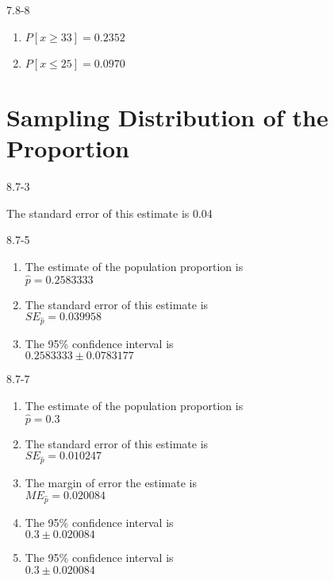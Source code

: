 \begin{exsol@solution}{7.8-8}



\begin{enumerate}
\item $P[ x \ge 33] = 0.2352$
\item $P[ x \le 25] = 0.0970$
\end{enumerate}

\end{exsol@solution}
\setcounter{chapter}{7}\chapter{Sampling Distribution of the Proportion}
\begin{exsol@solution}{8.7-3}

The standard error of this estimate is 0.04

\end{exsol@solution}
\begin{exsol@solution}{8.7-5}

\begin{enumerate}
\item	The estimate of the population proportion is \\ $ = 0.2583333$
\item	The standard error of this estimate is \\ $SE_{} = 0.039958$
\item	The 95\% confidence interval is \\ $0.2583333 $
\end{enumerate}
\end{exsol@solution}
\begin{exsol@solution}{8.7-7}

\begin{enumerate}
\item	The estimate of the population proportion is \\ $ = 0.3$
\item	The standard error of this estimate is \\ $SE_{} = 0.010247$
\item The margin of error the estimate is \\ $ME_{} = 0.020084$
\item	The 95\% confidence interval is \\ $0.3 $
\item	The 95\% confidence interval is \\ $0.3 $
\end{enumerate}
\end{exsol@solution}
